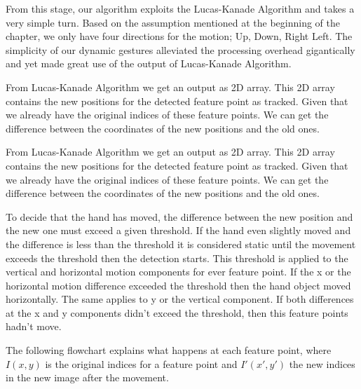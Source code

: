 \documentclass[12pt,fleqn]{book} %
\begin{document}
From this stage, our algorithm exploits the Lucas-Kanade Algorithm and takes a very simple turn. Based on the assumption mentioned at the beginning of the chapter, we only have four directions for the motion; Up, Down, Right Left. The simplicity of our dynamic gestures alleviated the processing overhead gigantically and yet made great use of the output of Lucas-Kanade Algorithm.\bigskip

From Lucas-Kanade Algorithm we get an output as 2D array. This 2D array contains the new positions for the detected feature point as tracked. Given that we already have the original indices of these feature points. We can get the difference between the coordinates of the new positions and the old ones.\bigskip

From Lucas-Kanade Algorithm we get an output as 2D array. This 2D array contains the new positions for the detected feature point as tracked. Given that we already have the original indices of these feature points. We can get the difference between the coordinates of the new positions and the old ones.\bigskip

To decide that the hand has moved, the difference between the new position and the new one must exceed a given threshold. If the hand even slightly moved and the difference is less than the threshold it is considered static until the movement exceeds the threshold then the detection starts. This threshold is applied to the vertical and horizontal motion components for ever feature point. If the x or the horizontal motion difference exceeded the threshold then the hand object moved horizontally. The same applies to y or the vertical component. If both differences at the x and y components didn’t exceed the threshold, then this feature points hadn’t move.\bigskip


The following flowchart explains what happens at each feature point, where $I(x,y)$ is the original indices for a feature point and $I'(x',y')$ the new indices in the new image after the movement. \bigskip

\begin{figure}[h]
\end{figure}
\end{document}

